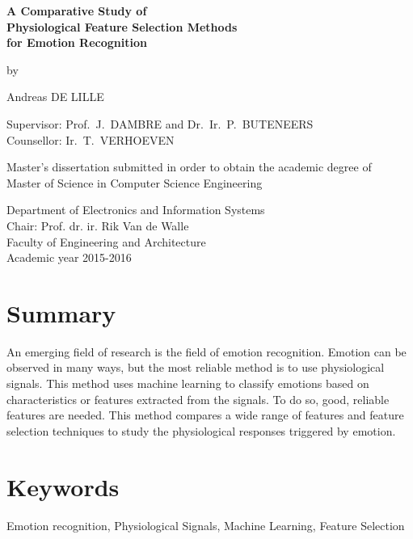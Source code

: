 
\newpage

{
\setlength{\baselineskip}{14pt}
\setlength{\parindent}{0pt}
\setlength{\parskip}{8pt}

\begin{center}

\textbf{\huge
A Comparative Study of \\
Physiological Feature Selection Methods \\
for Emotion Recognition\\
}

by

Andreas DE LILLE

\end{center}

Supervisor: Prof.~J.~DAMBRE and Dr.~Ir.~P.~BUTENEERS \\
Counsellor: Ir.~T.~VERHOEVEN

Master's dissertation submitted in order to obtain the academic degree of\\
Master of Science in Computer Science Engineering

Department of Electronics and Information Systems\\
Chair: Prof. dr. ir. Rik Van de Walle\\
Faculty of Engineering and Architecture\\
Academic year 2015-2016\\



\section*{Summary}

An emerging field of research is the field of emotion recognition. Emotion can be observed in many ways, but the most reliable method is to use physiological signals.  This method uses machine learning to classify emotions based on characteristics or features extracted from the signals. To do so, good, reliable features are needed. This method compares a wide range of features and feature selection techniques to study the physiological responses triggered by emotion.

\section*{Keywords}

Emotion recognition, Physiological Signals, Machine Learning, Feature Selection

}

\newpage %
